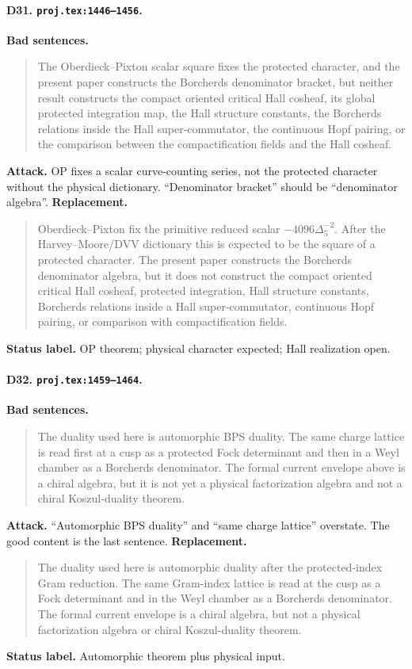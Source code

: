 \paragraph{D31. \texttt{proj.tex:1446--1456}.}
\textbf{Bad sentences.}
\begin{quote}\small
The Oberdieck--Pixton scalar square fixes the protected character, and
the present paper constructs the Borcherds denominator bracket, but
neither result constructs the compact oriented critical Hall cosheaf, its
global protected integration map, the Hall structure constants, the
Borcherds relations inside the Hall super-commutator, the continuous Hopf
pairing, or the comparison between the compactification fields and the
Hall cosheaf.
\end{quote}
\textbf{Attack.}
OP fixes a scalar curve-counting series, not the protected character
without the physical dictionary.  ``Denominator bracket'' should be
``denominator algebra''.
\textbf{Replacement.}
\begin{quote}\small
Oberdieck--Pixton fix the primitive reduced scalar
\(-4096\Delta_5^{-2}\).  After the Harvey--Moore/DVV dictionary this is
expected to be the square of a protected character.  The present paper
constructs the Borcherds denominator algebra, but it does not construct
the compact oriented critical Hall cosheaf, protected integration, Hall
structure constants, Borcherds relations inside a Hall super-commutator,
continuous Hopf pairing, or comparison with compactification fields.
\end{quote}
\textbf{Status label.} OP theorem; physical character expected; Hall
realization open.

\paragraph{D32. \texttt{proj.tex:1459--1464}.}
\textbf{Bad sentences.}
\begin{quote}\small
The duality used here is automorphic BPS duality.  The same charge
lattice is read first at a cusp as a protected Fock determinant and then
in a Weyl chamber as a Borcherds denominator.  The formal current envelope
above is a chiral algebra, but it is not yet a physical factorization
algebra and not a chiral Koszul-duality theorem.
\end{quote}
\textbf{Attack.}
``Automorphic BPS duality'' and ``same charge lattice'' overstate.  The
good content is the last sentence.
\textbf{Replacement.}
\begin{quote}\small
The duality used here is automorphic duality after the protected-index
Gram reduction.  The same Gram-index lattice is read at the cusp as a
Fock determinant and in the Weyl chamber as a Borcherds denominator.  The
formal current envelope is a chiral algebra, but not a physical
factorization algebra or chiral Koszul-duality theorem.
\end{quote}
\textbf{Status label.} Automorphic theorem plus physical input.

